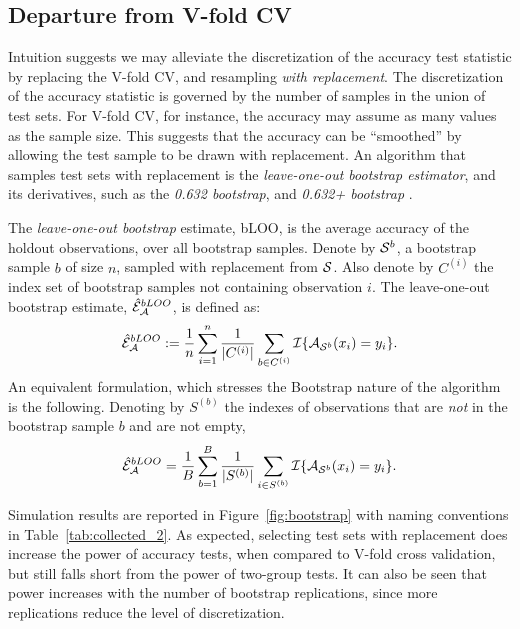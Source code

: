 \documentclass[journal]{IEEEtran}
\begin{document}
\subsection{Departure from V-fold CV}
\label{sec:bootstrap}

Intuition suggests we may alleviate the discretization of the accuracy test statistic by replacing the V-fold CV, and resampling \emph{with replacement}.
The discretization of the accuracy statistic is governed by the number of samples in the union of test sets.
For V-fold CV, for instance, the accuracy may assume as many values as the sample size. 
This suggests that the accuracy can be ``smoothed'' by allowing the test sample to be drawn with replacement. 
An algorithm that samples test sets with replacement is the \emph{leave-one-out bootstrap estimator},  and its derivatives, such as the \emph{0.632 bootstrap}, and \emph{0.632+ bootstrap} \cite[Sec 7.11]{hastie_elements_2003}.
\begin{definition}[bLOO]
	\label{def:bloo}
	The \emph{leave-one-out bootstrap} estimate, bLOO, is the average accuracy of the holdout observations, over all bootstrap samples. 
	Denote by $\mathcal{S}^b$, a bootstrap sample $b$ of size $n$, sampled with replacement from $\mathcal{S}$. 
	Also denote by $C^{(i)}$ the index set of bootstrap samples not containing observation $i$.
	The leave-one-out bootstrap estimate, $\hat{\mathcal{E}}_{\mathcal{A}}^{bLOO}$,  is defined as:
	\begin{align}
	\hat{\mathcal{E}}_{\mathcal{A}}^{bLOO}:= \frac 1n \sum_{i=1}^{n} \frac{1}{|C^{(i)}|} \sum_{b \in C^{(i)}} \mathcal{I}{\{ \mathcal{A}_{\mathcal{S}^b}(x_i)=y_i \}}.
	\end{align}
	An equivalent formulation, which stresses the Bootstrap nature of the algorithm is the following. 
	Denoting by $S^{(b)}$ the indexes of observations that are \emph{not} in the bootstrap sample $b$ and are not empty, 
	\begin{align}
	\hat{\mathcal{E}}_{\mathcal{A}}^{bLOO} = \frac 1B \sum_{b=1}^{B} \frac{1}{|S^{(b)}|} \sum_{i \in S^{(b)}} \mathcal{I}{\{ \mathcal{A}_{\mathcal{S}^b}(x_i)=y_i \}}.
	\end{align}
\end{definition}


Simulation results are reported in Figure~\ref{fig:bootstrap} with naming conventions in Table~\ref{tab:collected_2}.
As expected, selecting test sets with replacement does increase the power of accuracy tests, when compared to V-fold cross validation, but still falls short from the power of two-group tests. 
It can also be seen that power increases with the number of bootstrap replications, since more replications reduce the level of discretization.
\end{document}
